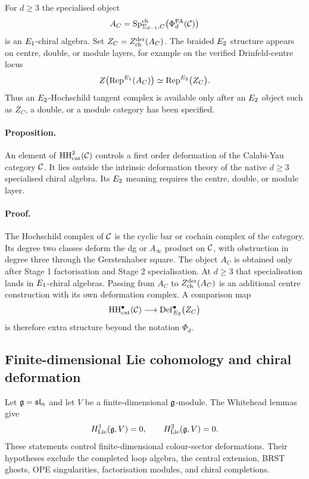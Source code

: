 For $d\geq 3$ the specialised object
\[
  A_C=\operatorname{Sp}^{\mathrm{ch}}_{\Sigma_{d-1},C}\bigl(\Phi^{\mathrm{FA}}_d(\mathcal{C})\bigr)
\]
is an $E_1$-chiral algebra. Set $Z_C=Z^{\mathrm{der}}_{\mathrm{ch}}(A_C)$. The braided
$E_2$ structure appears on centre, double, or module layers, for
example on the verified Drinfeld-centre locus
\[
  Z\bigl(\operatorname{Rep}^{E_1}(A_C)\bigr)
  \simeq
  \operatorname{Rep}^{E_2}\bigl(Z_C\bigr).
\]
Thus an $E_2$-Hochschild tangent complex is available only after an
$E_2$ object such as $Z_C$, a double, or a module category has been
specified.

\paragraph{Proposition.}
An element of $\mathrm{HH}^2_{\mathrm{cat}}(\mathcal{C})$ controls a first order
deformation of the Calabi-Yau category $\mathcal{C}$. It lies outside the
intrinsic deformation theory of the native $d\geq 3$ specialised
chiral algebra. Its $E_2$ meaning requires the centre, double, or
module layer.

\paragraph{Proof.}
The Hochschild complex of $\mathcal{C}$ is the cyclic bar or cochain complex of
the category. Its degree two classes deform the dg or $A_\infty$ product
on $\mathcal{C}$, with obstruction in degree three through the Gerstenhaber
square. The object $A_C$ is obtained only after Stage 1 factorisation
and Stage 2 specialisation. At $d\geq 3$ that specialisation lands in
$E_1$-chiral algebras. Passing from $A_C$ to $Z^{\mathrm{der}}_{\mathrm{ch}}(A_C)$ is an
additional centre construction with its own deformation complex. A
comparison map
\[
  \mathrm{HH}^\bullet_{\mathrm{cat}}(\mathcal{C})
  \longrightarrow
  \mathrm{Def}^\bullet_{E_2}\bigl(Z_C\bigr)
\]
is therefore extra structure beyond the notation $\Phi_d$.

\subsection{Finite-dimensional Lie cohomology and chiral deformation}

Let $\mathfrak{g}=\mathfrak{sl}_n$ and let $V$ be a finite-dimensional $\mathfrak{g}$-module. The
Whitehead lemmas give
\[
  H^1_{\mathrm{Lie}}(\mathfrak{g},V)=0,
  \qquad
  H^2_{\mathrm{Lie}}(\mathfrak{g},V)=0.
\]
These statements control finite-dimensional colour-sector
deformations. Their hypotheses exclude the completed loop algebra, the
central extension, BRST ghosts, OPE singularities, factorisation
modules, and chiral completions.

